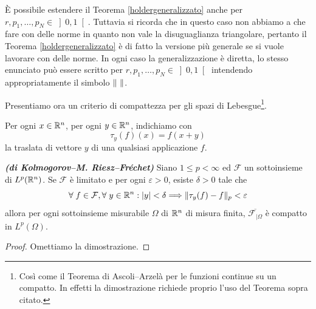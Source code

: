 \begin{osservazione}
È possibile estendere il Teorema \eqref{holdergeneralizzato} anche per $r, p_1,\dots, p_N \in \left] 0,1\right[ $. Tuttavia si ricorda che in questo caso non abbiamo a che fare con delle norme in quanto non vale la disuguaglianza triangolare, pertanto il Teorema \eqref{holdergeneralizzato} è di fatto la versione più generale se si vuole lavorare con delle norme. In ogni caso la generalizzazione è diretta, lo stesso enunciato può essere scritto per $r, p_1,\dots, p_N \in \left] 0,1\right[ $ intendendo appropriatamente il simbolo $\lVert\ \rVert$.
\end{osservazione}
Presentiamo ora un criterio di compattezza per gli spazi di Lebesgue\footnote{Così come il Teorema di Ascoli--Arzelà per le funzioni continue su un compatto. In effetti la dimostrazione richiede proprio l'uso del Teorema sopra citato.}.
\begin{notazione}
	Per ogni $x \in \mathbb{R}^n$, per ogni $y \in \mathbb{R}^n$, indichiamo con 
	\[ \tau_{y}(f)(x) = f(x+y) \]
	la traslata di vettore $y$ di una qualsiasi applicazione $f$.
\end{notazione}

\begin{teorema}\emph{\textbf{(di Kolmogorov--M. Riesz--Fréchet)}}
	Siano $1 \le p < \infty$ ed $\mathcal{F}$ un sottoinsieme di $L^p(\mathbb{R}^{n})$. Se $\mathcal{F}$ è limitato e per ogni $\varepsilon > 0$, esiste $\delta > 0$ tale che 
	\[ \forall\; f \in \mathcal{F},\forall\; y \in \mathbb{R}^n: \lvert y\rvert < \delta \Longrightarrow \lVert\tau_{y}(f)-f\rVert_{p} < \varepsilon \]
	allora per ogni sottoinsieme misurabile $\Omega$ di $\mathbb{R}^n$ di misura finita, $\overline{\mathcal{F}_{| \Omega}}$ è compatto in $L^p(\Omega)$.
\end{teorema}
\begin{proof}
	Omettiamo la dimostrazione.
\end{proof}

